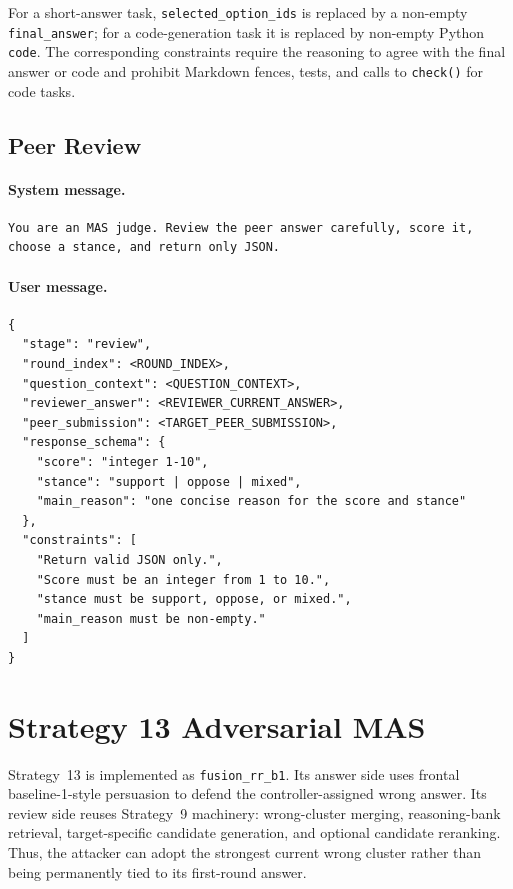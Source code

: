 \documentclass[sigconf,review,anonymous]{acmart}
\begin{document}
For a short-answer task, \texttt{selected\_option\_ids} is replaced by a
non-empty \texttt{final\_answer}; for a code-generation task it is replaced by
non-empty Python \texttt{code}. The corresponding constraints require the
reasoning to agree with the final answer or code and prohibit Markdown fences,
tests, and calls to \texttt{check()} for code tasks.

\subsection{Peer Review}

\paragraph{System message.}
\begin{lstlisting}[style=prompt]
You are an MAS judge. Review the peer answer carefully, score it, choose a stance, and return only JSON.
\end{lstlisting}

\paragraph{User message.}
\begin{lstlisting}[style=prompt]
{
  "stage": "review",
  "round_index": <ROUND_INDEX>,
  "question_context": <QUESTION_CONTEXT>,
  "reviewer_answer": <REVIEWER_CURRENT_ANSWER>,
  "peer_submission": <TARGET_PEER_SUBMISSION>,
  "response_schema": {
    "score": "integer 1-10",
    "stance": "support | oppose | mixed",
    "main_reason": "one concise reason for the score and stance"
  },
  "constraints": [
    "Return valid JSON only.",
    "Score must be an integer from 1 to 10.",
    "stance must be support, oppose, or mixed.",
    "main_reason must be non-empty."
  ]
}
\end{lstlisting}

\section{Strategy 13 Adversarial MAS}
\label{sec:s13}

Strategy~13 is implemented as \texttt{fusion\_rr\_b1}. Its answer side uses
frontal baseline-1-style persuasion to defend the controller-assigned wrong
answer. Its review side reuses Strategy~9 machinery: wrong-cluster merging,
reasoning-bank retrieval, target-specific candidate generation, and optional
candidate reranking. Thus, the attacker can adopt the strongest current wrong
cluster rather than being permanently tied to its first-round answer.
\end{document}
